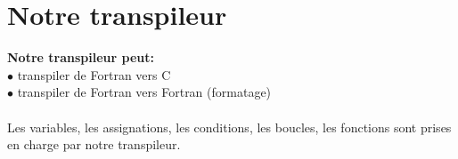\section{Notre transpileur}

\begin{frame}
    \textbf{Notre transpileur peut:}\\
    $\bullet$ transpiler de Fortran vers C\\
    $\bullet$ transpiler de Fortran vers Fortran (formatage)\\
    \vspace{0.5cm} {
        \\
        Les variables, les assignations, les conditions, les boucles, les fonctions sont prises en charge par notre transpileur. 
    }   

\end{frame}


\begin{frame}
\noindent
\begin{minipage}[t]{0.48\textwidth}
    
\end{minipage}
\hfill
\begin{minipage}[t]{0.48\textwidth}
\end{minipage}

\end{frame}

